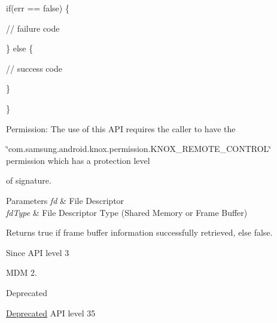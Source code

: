 \begin{DoxyPre}     if(err == false)  \{\end{DoxyPre}



\begin{DoxyPre}         // failure code\end{DoxyPre}



\begin{DoxyPre}     \} else \{\end{DoxyPre}



\begin{DoxyPre}         // success code\end{DoxyPre}



\begin{DoxyPre}     \}\end{DoxyPre}



\begin{DoxyPre}  \}\end{DoxyPre}



\begin{DoxyPre} \end{DoxyPre}


\begin{DoxyParagraph}{\-Permission\-: }
\-The use of this \-A\-P\-I requires the caller to have the
\end{DoxyParagraph}
\char`\"{}com.\-samsung.\-android.\-knox.\-permission.\-K\-N\-O\-X\-\_\-\-R\-E\-M\-O\-T\-E\-\_\-\-C\-O\-N\-T\-R\-O\-L\char`\"{} permission which has a protection level

of signature.


\begin{DoxyParams}{\-Parameters}
{\em fd} & \-File \-Descriptor\\
\hline
{\em fd\-Type} & \-File \-Descriptor \-Type (\-Shared \-Memory or \-Frame \-Buffer)\\
\hline
\end{DoxyParams}
\begin{DoxyReturn}{\-Returns}
{\ttfamily true} if frame buffer information successfully retrieved, else {\ttfamily false}.
\end{DoxyReturn}
\begin{DoxySince}{\-Since}
\-A\-P\-I level 3

\-M\-D\-M 2.
\end{DoxySince}
\begin{DoxyRefDesc}{\-Deprecated}
\item[\hyperlink{deprecated__deprecated000024}{\-Deprecated}]\-A\-P\-I level 35\end{DoxyRefDesc}


